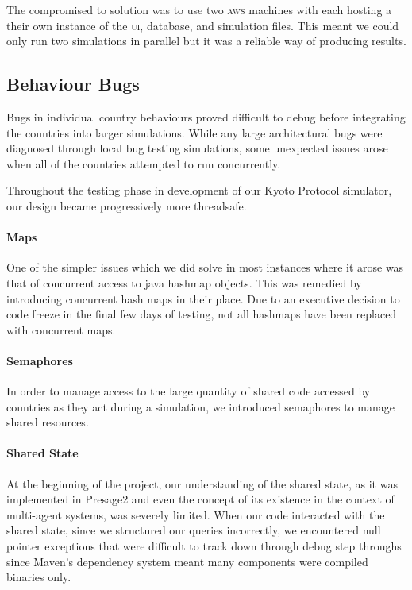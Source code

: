 The compromised to solution was to use two \textsc{aws} machines with each hosting a their own instance of the \textsc{ui}, database, and simulation files.  This meant we could only run two simulations in parallel but it was a reliable way of producing results.

\subsection{Behaviour Bugs}

Bugs in individual country behaviours proved difficult to debug before integrating the countries into larger simulations. While any large architectural bugs were diagnosed through local bug testing simulations, some unexpected issues arose when all of the countries attempted to run concurrently.

Throughout the testing phase in development of our Kyoto Protocol simulator, our design became progressively more threadsafe.

\paragraph{Maps} 
One of the simpler issues which we did solve in most instances where it arose was that of concurrent access to java hashmap objects. This was remedied by introducing concurrent hash maps in their place. Due to an executive decision to code freeze in the final few days of testing, not all hashmaps have been replaced with concurrent maps.

\paragraph{Semaphores}
In order to manage access to the large quantity of shared code accessed by countries as they act during a simulation, we introduced semaphores to manage shared resources.

\paragraph{Shared State}
At the beginning of the project, our understanding of the shared state, as it was implemented in Presage2 and even the concept of its existence in the context of multi-agent systems, was severely limited. When our code interacted with the shared state, since we structured our queries incorrectly, we encountered null pointer exceptions that were difficult to track down through debug step throughs since Maven's dependency system meant many components were compiled binaries only.

